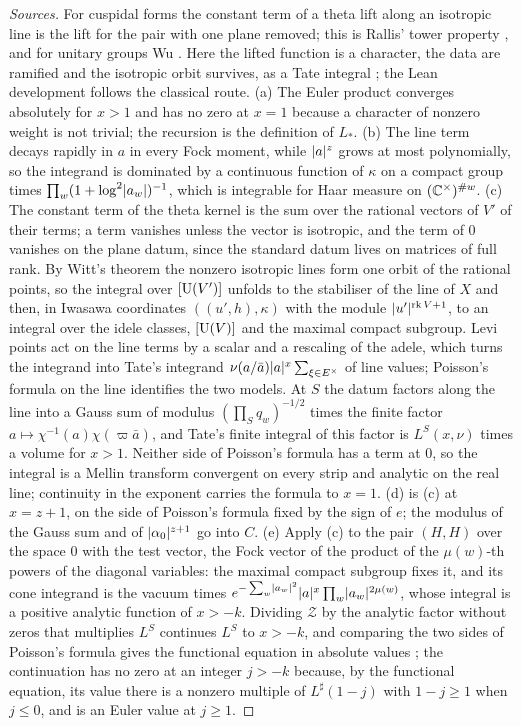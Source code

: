 \begin{proof}[Sources]
For cuspidal forms the constant term of a theta lift along an isotropic line is the lift for the pair with one plane removed; this is Rallis' tower property \cite[Thm.~I.1.1]{RallisHowe1984},
and for unitary groups Wu \cite[Prop.~3.1]{Wu2013}. Here the lifted function is a character, the data are ramified and the isotropic orbit survives, as a Tate integral \cite{Tate1967}; the Lean development
follows the classical route. (a) The Euler product converges absolutely for $x>1$ and has no zero at $x=1$ because a character of nonzero weight is not trivial; the recursion is the definition of
$L_*$. (b) The line term decays rapidly in $a$ in every Fock moment, while $\lvert a\rvert^z$ grows at most polynomially, so the integrand is dominated by a continuous function of $\kappa$ on a compact group
times $\prod_w(1+\log^2\lvert a_w\rvert)^{-1}$, which is integrable for Haar measure on $(\mathbb{C}^\times)^{\#w}$. (c) The constant term of the theta kernel is the sum over the rational vectors of $V'$ of their terms;
a term vanishes unless the vector is isotropic, and the term of $0$ vanishes on the plane datum, since the standard datum lives on matrices of full rank. By Witt's theorem the nonzero isotropic lines
form one orbit of the rational points, so the integral over $[\operatorname{U}(V')]$ unfolds to the stabiliser of the line of $X$ and then, in Iwasawa coordinates $((u',h),\kappa)$ with the module
$\lvert u'\rvert^{\operatorname{rk}V+1}$, to an integral over the idele classes, $[\operatorname{U}(V)]$ and the maximal compact subgroup. Levi points act on the line terms by a scalar and a rescaling of the adele, which turns
the integrand into Tate's integrand $\nu(a/\bar a)\lvert a\rvert^{x}\sum_{\xi\in E^\times}$ of line values; Poisson's formula on the line identifies the two models. At $S$ the datum factors along the line into
a Gauss sum of modulus $(\prod_Sq_w)^{-1/2}$ times the finite factor $a\mapsto\chi^{-1}(a)\chi(\varpi\bar a)$, and Tate's finite integral of this factor is $L^S(x,\nu)$ times a volume for $x>1$. Neither side
of Poisson's formula has a term at $0$, so the integral is a Mellin transform convergent on every strip and analytic on the real line; continuity in the exponent carries the formula to $x=1$. (d) is
(c) at $x=z+1$, on the side of Poisson's formula fixed by the sign of $e$; the modulus of the Gauss sum and of $\lvert \alpha_0\rvert^{z+1}$ go into $C$. (e) Apply (c) to the pair $(H,H)$ over the space $0$ with
the test vector, the Fock vector of the product of the $\mu(w)$-th powers of the diagonal variables: the maximal compact subgroup fixes it, and its cone integrand is the vacuum times
$e^{-\sum_w\lvert a_w\rvert^2}\lvert a\rvert^x\prod_w\lvert a_w\rvert^{2\mu(w)}$, whose integral is a positive analytic function of $x>-k$. Dividing $\mathcal Z$ by the analytic factor without zeros that multiplies $L^S$
continues $L^S$ to $x>-k$, and comparing the two sides of Poisson's formula gives the functional equation in absolute values \cite[\S4.4]{Tate1967}; the continuation has no zero at an integer $j>-k$
because, by the functional equation, its value there is a nonzero multiple of $L^\sharp(1-j)$ with $1-j\ge1$ when $j\le0$, and is an Euler value at $j\ge1$.
\end{proof}

